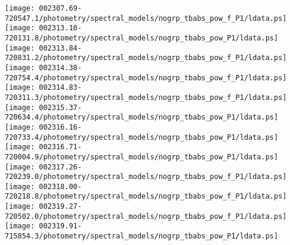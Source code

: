 \documentclass{aastex}
\begin{document}
\begin{figure*}[!ht]
\centering
\texttt{[image: 002307.69-720547.1/photometry/spectral\_models/nogrp\_tbabs\_pow\_f\_P1/ldata.ps]} \hfill 
\texttt{[image: 002313.10-720131.8/photometry/spectral\_models/nogrp\_tbabs\_pow\_P1/ldata.ps]} \hfill 
\texttt{[image: 002313.84-720831.2/photometry/spectral\_models/nogrp\_tbabs\_pow\_f\_P1/ldata.ps]} \\ 
\vspace*{0.5in}
\texttt{[image: 002314.38-720754.4/photometry/spectral\_models/nogrp\_tbabs\_pow\_f\_P1/ldata.ps]} \hfill 
\texttt{[image: 002314.83-720311.3/photometry/spectral\_models/nogrp\_tbabs\_pow\_f\_P1/ldata.ps]} \hfill 
\texttt{[image: 002315.37-720634.4/photometry/spectral\_models/nogrp\_tbabs\_pow\_P1/ldata.ps]} \\ 
\vspace*{0.5in}
\texttt{[image: 002316.16-720733.4/photometry/spectral\_models/nogrp\_tbabs\_pow\_P1/ldata.ps]} \hfill 
\texttt{[image: 002316.71-720004.9/photometry/spectral\_models/nogrp\_tbabs\_pow\_P1/ldata.ps]} \hfill 
\texttt{[image: 002317.26-720239.0/photometry/spectral\_models/nogrp\_tbabs\_pow\_f\_P1/ldata.ps]} \\ 
\vspace*{0.5in}
\texttt{[image: 002318.00-720218.8/photometry/spectral\_models/nogrp\_tbabs\_pow\_f\_P1/ldata.ps]} \hfill 
\texttt{[image: 002319.27-720502.0/photometry/spectral\_models/nogrp\_tbabs\_pow\_f\_P1/ldata.ps]} \hfill 
\texttt{[image: 002319.91-715854.3/photometry/spectral\_models/nogrp\_tbabs\_pow\_P1/ldata.ps]} \\ 
\vspace*{0.5in}
\end{figure*}
\clearpage
\end{document}
